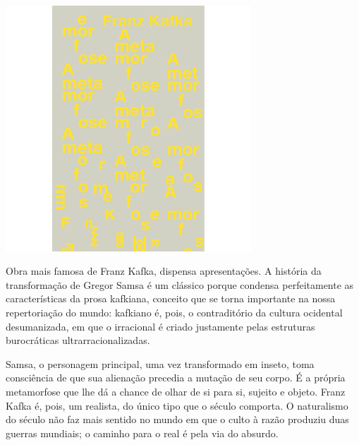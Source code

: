 \pagebreak

\begin{center}
\hspace*{-2.5cm}
\hspace*{2.5cm}\includegraphics[width=92mm]{./grid/kafka.png}
\end{center}

\hspace*{-7cm}\hrulefill\hspace*{-7cm}

\medskip

\noindent{}Obra mais famosa de Franz Kafka, {} dispensa apresentações. A história da transformação de Gregor Samsa é um clássico porque condensa perfeitamente as características da prosa kafkiana, conceito que se torna importante na nossa repertoriação do mundo: kafkiano é, pois, o contraditório da cultura ocidental desumanizada, em que o irracional é criado justamente pelas estruturas burocráticas ultrarracionalizadas.

Samsa, o personagem principal, uma vez transformado em inseto, toma consciência de que sua alienação precedia a mutação de seu corpo. É a própria metamorfose que lhe dá a chance de olhar de si para si, sujeito e objeto. Franz Kafka é, pois, um realista, do único tipo que o século  comporta. O naturalismo do século  não faz mais sentido no mundo em que o culto à razão produziu duas guerras mundiais; o caminho para o real é pela via do absurdo.


\vfill
\enlargethispage{\baselineskip}

